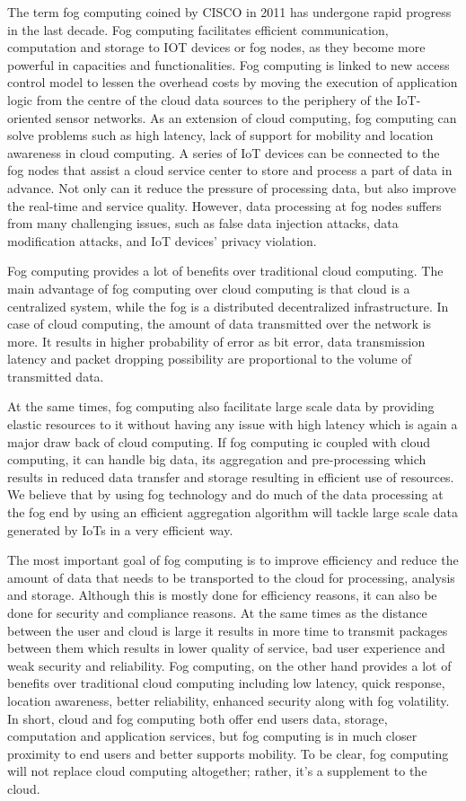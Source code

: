 \documentclass[10pt]{llncs}
\begin{document}
The term fog computing coined by CISCO in 2011 has undergone rapid progress in the last decade. Fog computing facilitates efficient communication, computation and storage to IOT devices or fog nodes, as they become more powerful in capacities and functionalities. Fog computing is linked to new access control model to lessen the overhead costs by moving the execution of application logic from the centre of the cloud data sources to the periphery of the IoT-oriented sensor networks. As an extension of cloud computing, fog computing can solve problems such as high latency, lack of support for mobility and location awareness in cloud computing. A series of IoT devices can be connected to the fog nodes that assist a cloud service center to store and process a part of data in advance. Not only can it reduce the pressure of processing data, but also improve the real-time and service quality. However, data processing at fog nodes suffers from many challenging issues, such as false data injection attacks, data modification attacks, and IoT devices’ privacy violation.

Fog computing provides a lot of benefits over traditional cloud computing. The main advantage of fog computing over cloud computing is that cloud is a centralized system, while the fog is a distributed decentralized infrastructure. In case of cloud computing, the amount of data transmitted over the network is more. It results in higher probability of error as bit error, data transmission latency and packet dropping possibility are proportional to the volume of transmitted data. 

At the same times, fog computing also facilitate large scale data by providing elastic resources to it without having any issue with high latency which is again a major draw back of cloud computing. If fog computing ic coupled with cloud computing, it can handle big data, its aggregation and pre-processing which results in reduced data transfer and storage resulting in efficient use of resources. We believe that by using fog technology and do much of the data processing at the fog end by using an efficient aggregation algorithm will tackle large scale data generated by IoTs in a very efficient way.

The most important goal of fog computing is to improve efficiency and reduce the amount of data that needs to be transported to the cloud for processing, analysis and storage. Although this is mostly done for efficiency reasons, it can also be done for security and compliance reasons. At the same times as the distance between the user and cloud is large it results in more time to transmit packages between them which results in lower quality of service, bad user experience and weak security and reliability. Fog computing, on the other hand provides a lot of benefits over traditional cloud computing including low latency, quick response, location awareness, better reliability, enhanced security along with fog volatility. In short, cloud and fog computing both offer end users data, storage, computation and application services, but fog computing is in much closer proximity to end users and better supports mobility. To be clear, fog computing will not replace cloud computing altogether; rather, it's a supplement to the cloud.
\end{document}
